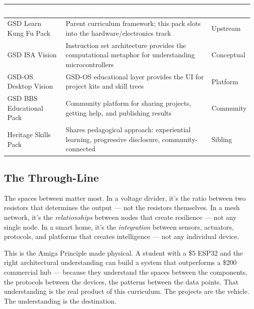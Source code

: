 \documentclass[11pt,letterpaper]{article}
\newcommand{\stageheader}[2]{%
  \noindent\colorbox{#2}{\makebox[\textwidth][l]{%
    \textcolor{white}{\bfseries\sffamily\hspace{6pt}#1\hspace{6pt}}}}%
  \vspace{0.5em}\par%
}
\newcommand{\tableheader}[1]{\textbf{\sffamily\textcolor{white}{#1}}}
\begin{document}
\begin{center}
\begin{tabularx}{\textwidth}{L{4cm}XC{2.5cm}}
\toprule
{}
\tableheader{Document} & \tableheader{Relationship} & \tableheader{Type} \\
\midrule
GSD Learn Kung Fu Pack & Parent curriculum framework; this pack slots into the hardware/electronics track & Upstream \\
GSD ISA Vision & Instruction set architecture provides the computational metaphor for understanding microcontrollers & Conceptual \\
GSD-OS Desktop Vision & GSD-OS educational layer provides the UI for project kits and skill trees & Platform \\
GSD BBS Educational Pack & Community platform for sharing projects, getting help, and publishing results & Community \\
Heritage Skills Pack & Shares pedagogical approach: experiential learning, progressive disclosure, community-connected & Sibling \\
\bottomrule
\end{tabularx}
\end{center}

\subsection{The Through-Line}

The spaces between matter most. In a voltage divider, it's the ratio between two resistors that determines the output --- not the resistors themselves. In a mesh network, it's the \textit{relationships} between nodes that create resilience --- not any single node. In a smart home, it's the \textit{integration} between sensors, actuators, protocols, and platforms that creates intelligence --- not any individual device.

This is the Amiga Principle made physical. A student with a \$5 ESP32 and the right architectural understanding can build a system that outperforms a \$200 commercial hub --- because they understand the spaces between the components, the protocols between the devices, the patterns between the data points. That understanding is the real product of this curriculum. The projects are the vehicle. The understanding is the destination.

\newpage

\stageheader{STAGE 2 --- RESEARCH REFERENCE}{secondary}
\end{document}
